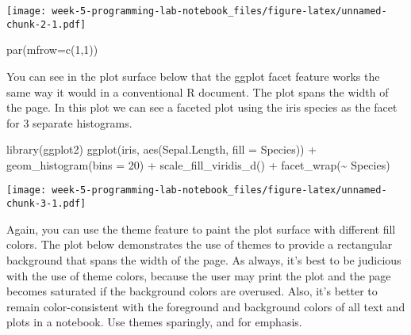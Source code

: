 \documentclass[
]{article}
\newenvironment{Shaded}{\begin{snugshade}}{\end{snugshade}}
\newcommand{\AttributeTok}[1]{\textcolor[rgb]{0.77,0.63,0.00}{#1}}
\newcommand{\DecValTok}[1]{\textcolor[rgb]{0.00,0.00,0.81}{#1}}
\newcommand{\FunctionTok}[1]{\textcolor[rgb]{0.00,0.00,0.00}{#1}}
\newcommand{\NormalTok}[1]{#1}
\newcommand{\SpecialCharTok}[1]{\textcolor[rgb]{0.00,0.00,0.00}{#1}}
\begin{document}
\texttt{[image: week-5-programming-lab-notebook\_files/figure-latex/unnamed-chunk-2-1.pdf]}

\begin{Shaded}
\begin{Highlighting}[]
\FunctionTok{par}\NormalTok{(}\AttributeTok{mfrow=}\FunctionTok{c}\NormalTok{(}\DecValTok{1}\NormalTok{,}\DecValTok{1}\NormalTok{))}
\end{Highlighting}
\end{Shaded}

You can see in the plot surface below that the ggplot facet feature
works the same way it would in a conventional R document. The plot spans
the width of the page. In this plot we can see a faceted plot using the
iris species as the facet for 3 separate histograms.

\begin{Shaded}
\begin{Highlighting}[]
\FunctionTok{library}\NormalTok{(ggplot2)}
\FunctionTok{ggplot}\NormalTok{(iris, }\FunctionTok{aes}\NormalTok{(Sepal.Length, }\AttributeTok{fill =}\NormalTok{ Species)) }\SpecialCharTok{+}
  \FunctionTok{geom\_histogram}\NormalTok{(}\AttributeTok{bins =} \DecValTok{20}\NormalTok{) }\SpecialCharTok{+}
  \FunctionTok{scale\_fill\_viridis\_d}\NormalTok{() }\SpecialCharTok{+}
  \FunctionTok{facet\_wrap}\NormalTok{(}\SpecialCharTok{\textasciitilde{}}\NormalTok{ Species)}
\end{Highlighting}
\end{Shaded}

\texttt{[image: week-5-programming-lab-notebook\_files/figure-latex/unnamed-chunk-3-1.pdf]}

Again, you can use the theme feature to paint the plot surface with
different fill colors. The plot below demonstrates the use of themes to
provide a rectangular background that spans the width of the page. As
always, it's best to be judicious with the use of theme colors, because
the user may print the plot and the page becomes saturated if the
background colors are overused. Also, it's better to remain
color-consistent with the foreground and background colors of all text
and plots in a notebook. Use themes sparingly, and for emphasis.
\end{document}
